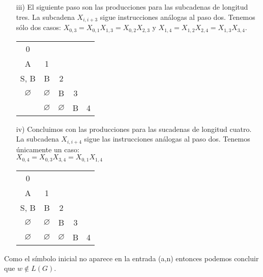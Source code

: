 \documentclass[letterpaper,11pt]{article}
\begin{document}
\begin{enumerate}
\begin{itemize}
            \newpage
         \item[iii)] El siguiente paso son las producciones para las subcadenas
         de longitud tres. La subcadena $X_{i, i+3}$ sigue instrucciones 
         análogas al paso dos. Tenemos sólo dos casos:
         $X_{0,3} = X_{0,1}X_{1,3} = X_{0,2}X_{2,3}$ y
         $X_{1,4} = X_{1,2}X_{2,4} = X_{1,3}X_{3,4}$.
         \begin{center}
                \begin{tabular}{c | c | c| c | c}
                     0   \\
                     A & 1  \\
                     S, B & B & 2 \\
                     $\varnothing$ & $\varnothing$ & B & 3 \\
                     & $\varnothing$ & $\varnothing$ & B & 4\\
                     \hline
                \end{tabular}
            \end{center}
         \item[iv)] Concluimos con las producciones para las sucadenas de 
         longitud cuatro. La subcadena $X_{i, i+4}$ sigue las instrucciones
         análogas al paso dos. Tenemos únicamente un caso:\\
         $X_{0,4} = X_{0,3}X_{3,4} = X_{0,1}X_{1,4}$
         \begin{center}
                \begin{tabular}{c | c | c| c | c}
                     0   \\
                     A & 1  \\
                     S, B & B & 2 \\
                     $\varnothing$ & $\varnothing$ & B & 3 \\
                     $\varnothing$ & $\varnothing$ & $\varnothing$ & B & 4\\
                     \hline
                \end{tabular}
            \end{center}
        \end{itemize}
        Como el símbolo inicial no aparece en la entrada (a,n) entonces podemos
        concluir que $w \notin L(G)$. 
    \end{enumerate}
\end{document}
